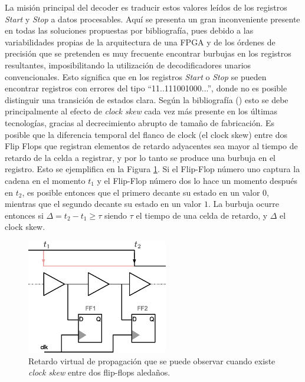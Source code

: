 La misión principal del decoder es traducir estos valores leídos de los registros \textit{Start} y \textit{Stop} a datos procesables. 
Aquí se presenta un gran inconveniente presente en todas las soluciones propuestas por bibliografía, pues debido a las variabilidades
propias de la arquitectura de una FPGA y de los órdenes de precisión que se pretenden es muy frecuente encontrar burbujas en los registros
resultantes, imposibilitando la utilización de decodificadores unarios convencionales. Esto significa que en los registros \textit{Start} o
\textit{Stop} se pueden encontrar registros con errores del tipo ``11..111001000...'', donde no es posible distinguir una transición de
estados clara. Según la bibliografía (\cite{Machado}) esto se debe principalmente al efecto de \textit{clock skew} cada vez más presente en los últimas tecnologías,
gracias al decrecimiento abrupto de tamaño de fabricación. Es posible que la diferencia temporal del flanco de clock (el clock skew) 
entre dos Flip Flops que registran elementos de retardo adyacentes sea mayor al tiempo de retardo de la celda a registrar, y por lo tanto 
se produce una burbuja en el registro. Esto se ejemplifica en la Figura \ref{fig: bubble}. Si el Flip-Flop número uno
captura la cadena en el momento $t_1$ y el Flip-Flop número dos lo hace un momento después en $t_2$, es posible entonces que el primero
decante su estado en un valor $0$, mientras que el segundo decante su estado en un valor $1$. La burbuja ocurre entonces si $\Delta = t_2 - t_1 \geq \tau$
siendo $\tau$ el tiempo de una celda de retardo, y $\Delta$ el clock skew.

\begin{figure}[H]
      \centering
      \includegraphics[width=0.55\textwidth]{imagenes/bubble.eps}
      \caption{Retardo virtual de propagación que se puede observar cuando existe \textit{clock skew} entre dos flip-flops aledaños.}
      \label{fig: bubble}
\end{figure}

